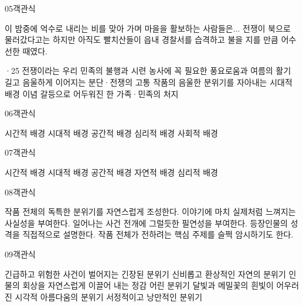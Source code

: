 \documentclass[fs85,seriesRus]{korfarm-base}
\begin{document}
\begin{kfQBlock}{05}{객관식}
\begin{kfEvidence}이 밤중에 억수로 내리는 비를 맞아 가며 마을을 활보하는 사람들은... 전쟁이 북으로 물러갔다고는 하지만 아직도 빨치산들이 읍내 경찰서를 습격하고 불을 지를 만큼 어수선한 때였다.\end{kfEvidence}
\begin{kfChoices}
·25 전쟁이라는 우리 민족의 불행과 시련
\kfChoice 농사에 꼭 필요한 풍요로움과 여름의 활기
\kfChoice 길고 음울하게 이어지는 분단·전쟁의 고통
\kfChoice 작품의 음울한 분위기를 자아내는 시대적 배경
\kfChoice 이념 갈등으로 어두워진 한 가족·민족의 처지
\end{kfChoices}
\end{kfQBlock}
\begin{kfQBlock}{06}{객관식}
\begin{kfChoices}
\kfChoice 시간적 배경
\kfChoice 시대적 배경
\kfChoice 공간적 배경
\kfChoice 심리적 배경
\kfChoice 사회적 배경
\end{kfChoices}
\end{kfQBlock}
\begin{kfQBlock}{07}{객관식}
\begin{kfChoices}
\kfChoice 시간적 배경
\kfChoice 시대적 배경
\kfChoice 공간적 배경
\kfChoice 자연적 배경
\kfChoice 심리적 배경
\end{kfChoices}
\end{kfQBlock}
\begin{kfQBlock}{08}{객관식}
\begin{kfChoices}
\kfChoice 작품 전체의 독특한 분위기를 자연스럽게 조성한다.
\kfChoice 이야기에 마치 실제처럼 느껴지는 사실성을 부여한다.
\kfChoice 일어나는 사건 전개에 그럴듯한 필연성을 부여한다.
\kfChoice 등장인물의 성격을 직접적으로 설명한다.
\kfChoice 작품 전체가 전하려는 핵심 주제를 슬쩍 암시하기도 한다.
\end{kfChoices}
\end{kfQBlock}
\begin{kfQBlock}{09}{객관식}
\begin{kfChoices}
\kfChoice 긴급하고 위험한 사건이 벌어지는 긴장된 분위기
\kfChoice 신비롭고 환상적인 자연의 분위기
\kfChoice 인물의 회상을 자연스럽게 이끌어 내는 정감 어린 분위기
\kfChoice 달빛과 메밀꽃의 흰빛이 어우러진 시각적 아름다움의 분위기
\kfChoice 서정적이고 낭만적인 분위기
\end{kfChoices}
\end{kfQBlock}
\end{document}
